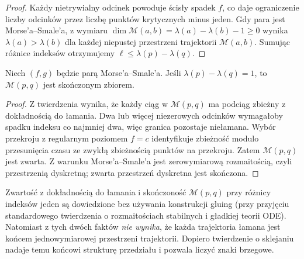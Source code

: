 \begin{proof}
Każdy nietrywialny odcinek powoduje ścisły spadek $f$,
co daje ograniczenie liczby odcinków przez liczbę
punktów krytycznych minus jeden.
Gdy para jest Morse'a--Smale'a, z wymiaru
$\dim\mathcal M(a,b)=\lambda(a)-\lambda(b)-1\ge0$
wynika $\lambda(a)>\lambda(b)$ dla każdej niepustej
przestrzeni trajektorii $\mathcal M(a,b)$.
Sumując różnice indeksów otrzymujemy
$\ell\le\lambda(p)-\lambda(q)$.
\end{proof}

\begin{wniosek}
\label{cor:morse-rigid-finite-v11}
Niech $(f,g)$ będzie parą Morse'a--Smale'a.
Jeśli $\lambda(p)-\lambda(q)=1$, to
$\mathcal M(p,q)$ jest skończonym zbiorem.
\end{wniosek}
\begin{proof}
Z twierdzenia wynika, że każdy ciąg w $\mathcal M(p,q)$
ma podciąg zbieżny z dokładnością do łamania.
Dwa lub więcej niezerowych odcinków wymagałoby spadku indeksu
co najmniej dwa, więc granica pozostaje niełamana.
Wybór przekroju z regularnym poziomem $f=c$ identyfikuje
zbieżność modulo przesunięcia czasu ze zwykłą zbieżnością
punktów na przekroju. Zatem $\mathcal M(p,q)$ jest zwarta.
Z warunku Morse'a--Smale'a jest zerowymiarową rozmaitością,
czyli przestrzenią dyskretną; zwarta przestrzeń dyskretna
jest skończona.
\end{proof}

\begin{uwaga}
Zwartość z dokładnością do łamania i skończoność
$\mathcal M(p,q)$ przy różnicy indeksów jeden są dowiedzione
bez używania konstrukcji gluing (przy przyjęciu
standardowego twierdzenia o rozmaitościach stabilnych
i gładkiej teorii ODE). Natomiast z tych dwóch
faktów \emph{nie wynika}, że każda trajektoria łamana
jest końcem jednowymiarowej przestrzeni trajektorii.
Dopiero twierdzenie o sklejaniu nadaje temu końcowi
strukturę przedziału i pozwala liczyć znaki brzegowe.
\end{uwaga}


